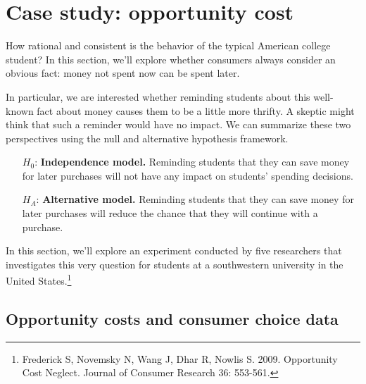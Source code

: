 
\section{Case study: opportunity cost}

How rational and consistent is the behavior of the typical American college student? In this section, we'll explore whether consumers always consider an obvious fact: money not spent now can be spent later.

In particular, we are interested whether reminding students about this well-known fact about money causes them to be a little more thrifty. A skeptic might think that such a reminder would have no impact. We can summarize these two perspectives using the null and alternative hypothesis framework.
\begin{itemize}
\setlength{\itemsep}{0mm}
\item[$H_0$:] \textbf{Independence model.} Reminding students that they can save money for later purchases will not have any impact on students' spending decisions.
\item[$H_A$:] \textbf{Alternative model.} Reminding students that they can save money for later purchases will reduce the chance that they will continue with a purchase.
\end{itemize}
In this section, we'll explore an experiment conducted by five researchers that investigates this very question for students at a southwestern university in the United States.\footnote{Frederick S, Novemsky N, Wang J, Dhar R, Nowlis S. 2009. Opportunity Cost Neglect. Journal of Consumer Research 36: 553-561.}

\subsection{Opportunity costs and consumer choice data}

